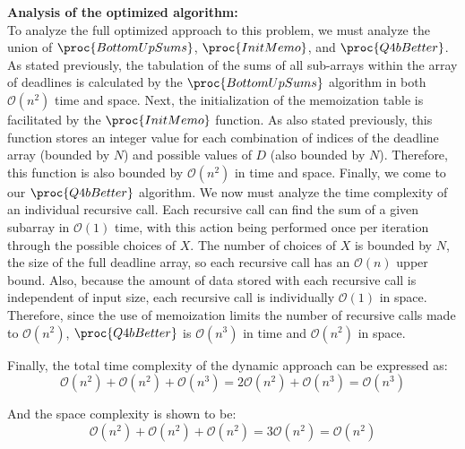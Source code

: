 \textbf{Analysis of the optimized algorithm:}\\
To analyze the full optimized approach to this problem, we must analyze the union of $\proc{BottomUpSums}$, $\proc{InitMemo}$, and $\proc{Q4bBetter}$.
As stated previously, the tabulation of the sums of all sub-arrays within the array of deadlines is calculated by the $\proc{BottomUpSums}$ algorithm in both $\mathcal{O}(n^2)$ time and space.
Next, the initialization of the memoization table is facilitated by the $\proc{InitMemo}$ function.
As also stated previously, this function stores an integer value for each combination of indices of the deadline array (bounded by $N$) and possible values of $D$ (also bounded by $N$).
Therefore, this function is also bounded by $\mathcal{O}(n^2)$ in time and space.
Finally, we come to our $\proc{Q4bBetter}$ algorithm.
We now must analyze the time complexity of an individual recursive call.
Each recursive call can find the sum of a given subarray in $\mathcal{O}(1)$ time, with this action being performed once per iteration through the possible choices of $X$.
The number of choices of $X$ is bounded by $N$, the size of the full deadline array, so each recursive call has an $\mathcal{O}(n)$ upper bound.
Also, because the amount of data stored with each recursive call is independent of input size, each recursive call is individually $\mathcal{O}(1)$ in space.
Therefore, since the use of memoization limits the number of recursive calls made to $\mathcal{O}(n^2)$, $\proc{Q4bBetter}$ is $\mathcal{O}(n^3)$ in time and $\mathcal{O}(n^2)$ in space.

Finally, the total time complexity of the dynamic approach can be expressed as:
\[\mathcal{O}(n^2) + \mathcal{O}(n^2) + \mathcal{O}(n^3) = 2\mathcal{O}(n^2) + \mathcal{O}(n^3) = \mathcal{O}(n^3)\]

And the space complexity is shown to be:
\[\mathcal{O}(n^2) + \mathcal{O}(n^2) + \mathcal{O}(n^2) = 3\mathcal{O}(n^2) = \mathcal{O}(n^2)\]



